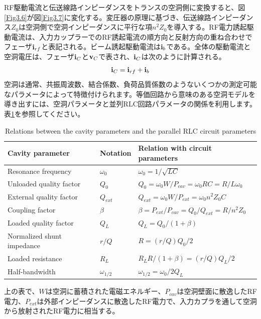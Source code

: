 \documentclass[book]{jlreq}
\begin{document}
RF駆動電流と伝送線路インピーダンスをトランスの空洞側に変換すると、図\ref{Fig3.6}が図\ref{Fig3.7}に変化する。変圧器の原理に基づき、伝送線路インピーダンス$Z_0$は空洞側で空洞インピーダンスに平行な項$n^2 Z_0$を導入する。RF電力誘起駆動電流は、入力カップラーでのRF誘起電流の順方向と反射方向の重ね合わせでフェーザ$\vb{i}_{rf}$と表記される。ビーム誘起駆動電流は$\vb{i}_b$である。全体の駆動電流と空洞電圧は、フェーザ$\vb{i}_C$と$\vb{v}_C$で表され、$\vb{i}_C$は次のように計算される。
%
\begin{equation}
    \vb{i}_C = \vb{i}_{rf} + \vb{i}_b
    \label{eq:3.11}
\end{equation}
%
空洞は通常、共振周波数、結合係数、負荷品質係数のようないくつかの測定可能なパラメータによって特徴付けられます。等価回路から意味のある空洞モデルを導き出すには、空洞パラメータと並列RLC回路パラメータの関係を利用します。表\ref{Table3.1}を参照してください。

\begin{table}[hbt]
    \caption{Relations between the cavity parameters and the parallel RLC circuit parameters}
    \label{Table3.1}
    \centering
    \begin{tabular}{l|l|l} \hline
        Cavity parameter & Notation & Relation with circuit parameters \\ \hline \hline
        Resonance frequency & $\omega_0$ & $\omega_0 = 1/\sqrt{LC}$ \\ \hline
        Unloaded quality factor & $Q_0$ & $Q_0 = \omega_0 W/P_{cav} = \omega_0 R C = R/L\omega_0$ \\ \hline
        External quality factor & $Q_{ext}$ & $Q_{ext} = \omega_0 W/P_{ext} = \omega_0 n^2 Z_0 C$ \\ \hline
        Coupling factor & $\beta$ & $\beta = P_{ext}/P_{cav} = Q_0/Q_{ext} = R/n^2 Z_0$ \\ \hline
        Loaded quality factor & $Q_L$ & $Q_L = Q_0/(1+\beta)$ \\ \hline
        Normalized shunt impedance & $r/Q$ & $R = (r/Q)Q_0/2$ \\ \hline
        Loaded resistance & $R_L$ & $R_L R/(1+\beta) = (r/Q)Q_L/2$ \\ \hline
        Half-bandwidth & $\omega_{1/2}$ & $\omega_{1/2} = \omega_0/2Q_L$ \\ \hline
    \end{tabular}
\end{table}

上の表で、$W$は空洞に蓄積された電磁エネルギー、$P_{cav}$は空洞壁面に散逸したRF電力、$P_{ext}$は外部インピーダンスに散逸したRF電力で、入力カプラを通して空洞から放射されたRF電力に相当する。
\end{document}

